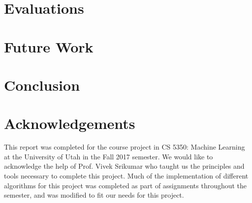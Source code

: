 \section{Evaluations}

\section{Future Work}

\section{Conclusion}

\section*{Acknowledgements}
This report was completed for the course project in CS 5350: Machine Learning at the University of Utah in the Fall 2017 semester. We would like to acknowledge the help of Prof. Vivek Srikumar who taught us the principles and tools necessary to complete this project. Much of the implementation of different algorithms for this project was completed as part of assignments throughout the semester, and was modified to fit our needs for this project.